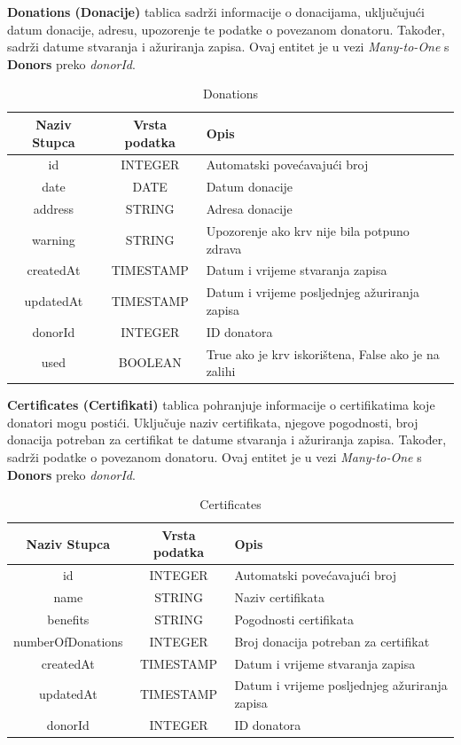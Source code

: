 \documentclass[12pt]{article}
\begin{document}
\noindent
\textbf{Donations (Donacije)} tablica sadrži informacije o donacijama, uključujući
datum donacije, adresu, upozorenje te podatke o povezanom donatoru. Također, sadrži
datume stvaranja i ažuriranja zapisa. Ovaj entitet je u vezi \textit{Many-to-One}
s \textbf{Donors} preko \textit{donorId}.
\begin{table}[H]
	\renewcommand{\arraystretch}{2}
	\centering
	\begin{tabularx}
		{1\textwidth}{|c|c|X|} \hline \textbf{Naziv Stupca} & \textbf{Vrsta
		podatka} & \textbf{Opis} \\ \hline \cellcolor{LightGreen}id & INTEGER & Automatski
		povećavajući broj \\ \hline date & DATE & Datum donacije \\ \hline address
		  & STRING & Adresa donacije \\ \hline warning & STRING & Upozorenje ako krv
		nije bila potpuno zdrava \\ \hline createdAt & TIMESTAMP & Datum i vrijeme
		stvaranja zapisa \\ \hline updatedAt & TIMESTAMP & Datum i vrijeme posljednjeg
		ažuriranja zapisa \\ \hline \cellcolor{LightBlue} donorId & INTEGER & ID
		donatora \\ \hline
		used & BOOLEAN & True ako je krv iskorištena, False ako je na zalihi\\ \hline
	\end{tabularx}
	\caption{Donations}
	\label{tab:my_label}
\end{table}
\clearpage %

\noindent
\textbf{Certificates (Certifikati)} tablica pohranjuje informacije o certifikatima
koje donatori mogu postići. Uključuje naziv certifikata, njegove pogodnosti,
broj donacija potreban za certifikat te datume stvaranja i ažuriranja zapisa. Također,
sadrži podatke o povezanom donatoru. Ovaj entitet je u vezi \textit{Many-to-One}
s \textbf{Donors} preko \textit{donorId}.
\begin{table}[H]
	\renewcommand{\arraystretch}{2}
	\centering
	\begin{tabularx}
		{1\textwidth}{|c|c|X|} \hline \textbf{Naziv Stupca} & \textbf{Vrsta
		podatka} & \textbf{Opis} \\ \hline \cellcolor{LightGreen} id & INTEGER &
		Automatski povećavajući broj \\ \hline name & STRING & Naziv certifikata
		\\ \hline benefits & STRING & Pogodnosti certifikata \\ \hline
		numberOfDonations & INTEGER & Broj donacija potreban za certifikat \\
		\hline createdAt & TIMESTAMP & Datum i vrijeme stvaranja zapisa \\ \hline
		updatedAt & TIMESTAMP & Datum i vrijeme posljednjeg ažuriranja zapisa \\
		\hline \cellcolor{LightBlue} donorId & INTEGER & ID donatora \\ \hline
	\end{tabularx}
	\caption{Certificates}
	\label{tab:my_label}
\end{table}
\clearpage %
\end{document}
